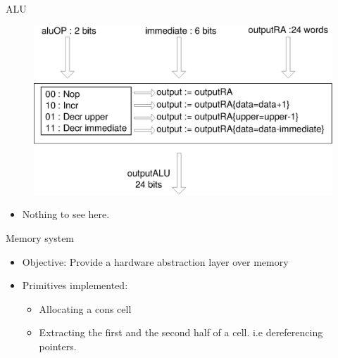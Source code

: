 \documentclass{beamer}
\begin{document}
\begin{frame}{ALU}
\begin{figure}[h]
\center
\includegraphics[scale=0.40]{ALU.eps}
\end{figure}
\pause
\begin{itemize}
\item Nothing to see here.
\end{itemize}
\end{frame}

\begin{frame}{Memory system}
\begin{itemize}
\item Objective: Provide a hardware abstraction layer over memory
\item Primitives implemented:
\begin{itemize}
\item Allocating a cons cell
\item Extracting the first and the second half of a cell. i.e dereferencing
pointers.
\end{itemize}   
\end{itemize}
\end{frame}
\end{document}
